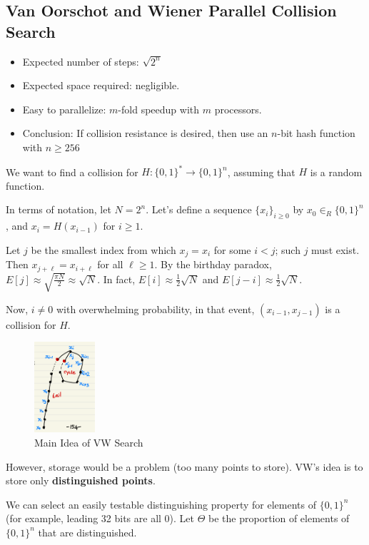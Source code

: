 \documentclass[12pt,titlepage]{article}
\begin{document}
\subsection{Van Oorschot and Wiener Parallel Collision Search}
\begin{itemize}
	\item Expected number of steps: $\sqrt{2^n}$
	\item Expected space required: negligible.
	\item Easy to parallelize: $m$-fold speedup with $m$ processors.
	\item Conclusion: If collision resistance is desired, then use an $n$-bit hash function with $n \geq 256$
\end{itemize}

We want to find a collision for $H: \{0,1\}^* \rightarrow \{0,1\}^n$, assuming that $H$ is a random function. 

In terms of notation, let $N = 2^n$. Let's define a sequence $\{x_i\}_{i \geq 0}$ by $x_0 \in_R \{0, 1\}^n$, and $x_i = H(x_{i-1})$ for $i \geq 1$. 

Let $j$ be the smallest index from which $x_j = x_i$ for some $i < j$; such $j$ must exist. Then $x_{j+\ell} = x_{i+\ell}$ for all $\ell \geq 1$. By the birthday paradox, $E[j] \approx \sqrt{\frac{\pi N}{2}} \approx \sqrt{N}$. In fact, $E[i] \approx \frac{1}{2}\sqrt{N}$ and $E[j-i] \approx \frac{1}{2}\sqrt{N}$. 

Now, $i \neq 0$ with overwhelming probability, in that event, $(x_{i-1}, x_{j-1})$ is a collision for $H$. 

\begin{center}
	\begin{figure}[h!]
		\centering
		\includegraphics[width=0.2\textwidth]{VW_1.png}
		\caption{Main Idea of VW Search}
	\end{figure}
\end{center}

However, storage would be a problem (too many points to store). VW's idea is to store only \textbf{distinguished points}.

We can select an easily testable distinguishing property for elements of $\{0,1\}^n$ (for example, leading 32 bits are all 0). Let $\Theta$ be the proportion of elements of $\{0,1\}^n$ that are distinguished. 
\end{document}

